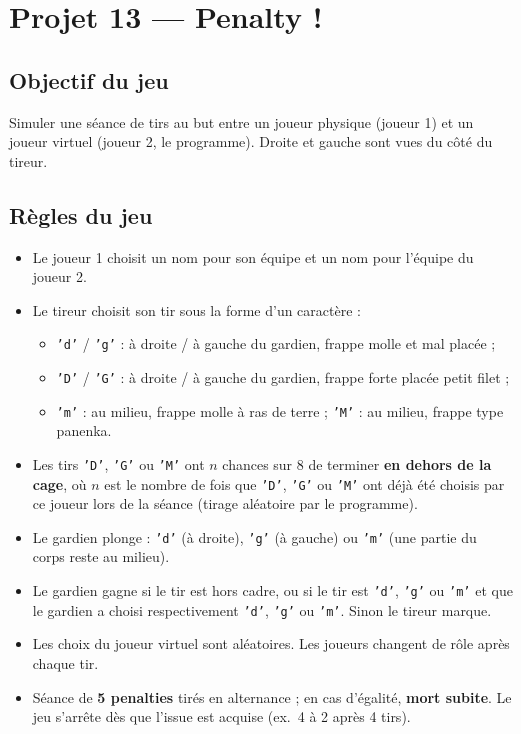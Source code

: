 \section{Projet 13 — Penalty !}

\subsection*{Objectif du jeu}
Simuler une séance de tirs au but entre un joueur physique (joueur 1) et un joueur virtuel (joueur 2, le programme). Droite et gauche sont vues du côté du tireur.

\subsection*{Règles du jeu}
\begin{itemize}
  \item Le joueur 1 choisit un nom pour son équipe et un nom pour l'équipe du joueur 2.
  \item Le tireur choisit son tir sous la forme d'un caractère :
  \begin{itemize}
    \item \texttt{'d'} / \texttt{'g'} : à droite / à gauche du gardien, frappe molle et mal placée ;
    \item \texttt{'D'} / \texttt{'G'} : à droite / à gauche du gardien, frappe forte placée petit filet ;
    \item \texttt{'m'} : au milieu, frappe molle à ras de terre ; \texttt{'M'} : au milieu, frappe type panenka.
  \end{itemize}
  \item Les tirs \texttt{'D'}, \texttt{'G'} ou \texttt{'M'} ont $n$ chances sur 8 de terminer \textbf{en dehors de la cage}, où $n$ est le nombre de fois que \texttt{'D'}, \texttt{'G'} ou \texttt{'M'} ont déjà été choisis par ce joueur lors de la séance (tirage aléatoire par le programme).
  \item Le gardien plonge : \texttt{'d'} (à droite), \texttt{'g'} (à gauche) ou \texttt{'m'} (une partie du corps reste au milieu).
  \item Le gardien gagne si le tir est hors cadre, ou si le tir est \texttt{'d'}, \texttt{'g'} ou \texttt{'m'} et que le gardien a choisi respectivement \texttt{'d'}, \texttt{'g'} ou \texttt{'m'}. Sinon le tireur marque.
  \item Les choix du joueur virtuel sont aléatoires. Les joueurs changent de rôle après chaque tir.
  \item Séance de \textbf{5 penalties} tirés en alternance ; en cas d'égalité, \textbf{mort subite}. Le jeu s'arrête dès que l'issue est acquise (ex.\ 4 à 2 après 4 tirs).
\end{itemize}

